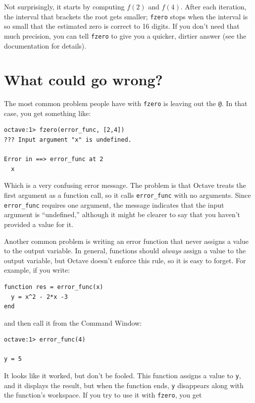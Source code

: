 \documentclass{book}
\begin{document}
Not surprisingly, it starts by computing $f(2)$ and $f(4)$. After
each iteration, the interval that brackets the root gets smaller;
{\tt fzero} stops when the interval is so small that the estimated
zero is correct to 16 digits. If you
don't need that much precision, you can tell {\tt fzero} to give
you a quicker, dirtier answer (see the documentation for details).


\section{What could go wrong?}

The most common problem people have with {\tt fzero} is leaving
out the {\tt @}. In that case, you get something like:

\begin{verbatim}
octave:1> fzero(error_func, [2,4])
??? Input argument "x" is undefined.

Error in ==> error_func at 2
  x
\end{verbatim}

Which is a very confusing error message. The problem is that Octave
treats the first argument as a function call, so it calls {\tt error\_func}
with no arguments. Since {\tt error\_func} requires one argument, the
message indicates that the input argument is ``undefined,'' although
it might be clearer to say that you haven't provided a value for it.

Another common problem is writing an error function that never
assigns a value to the output variable. In general, functions should
{\em always} assign a value to the output variable, but Octave doesn't
enforce this rule, so it is easy to forget. For example, if you
write:

\begin{verbatim}
function res = error_func(x)
  y = x^2 - 2*x -3
end
\end{verbatim}

and then call it from the Command Window:

\begin{verbatim}
octave:1> error_func(4)

y = 5
\end{verbatim}

It looks like it worked, but don't be fooled. This function assigns
a value to {\tt y}, and it displays the result, but when the function
ends, {\tt y} disappears along with the function's workspace.
If you try to use it with {\tt fzero}, you get
\end{document}
